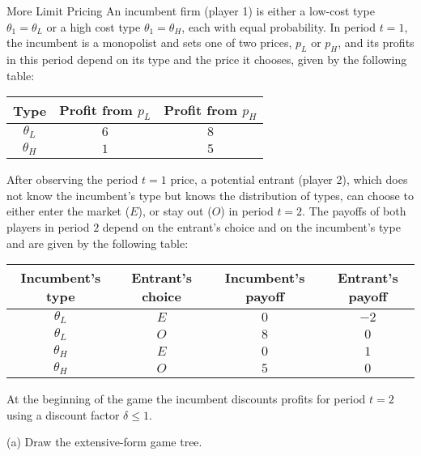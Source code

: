 \documentclass[8pt]{extarticle}
\title{}
\author{}
\date{}
\begin{document}
  \begin{problem}{More Limit Pricing}
    An incumbent firm (player 1) is either a low-cost type $\theta_1 = \theta_L$ or a high cost type $\theta_1 = \theta_H$, each with equal probability. In period $t=1$, the incumbent is a monopolist and sets one of two prices, $p_L$ or $p_H$, and its profits in this period depend on its type and the price it chooses, given by the following table:
    \begin{center}
      \begin{tabular}{ccc}
        Type & Profit from $p_L$ & Profit from $p_H$\\
        \hline
        $\theta_L$ & $6$ & $8$\\
        $\theta_H$ & $1$ & $5$
      \end{tabular}
    \end{center}
    After observing the period $t=1$ price, a potential entrant (player 2), which does not know the incumbent's type but knows the distribution of types, can choose to either enter the market ($E$), or stay out ($O$) in period $t=2$. The payoffs of both players in period $2$ depend on the entrant's choice and on the incumbent's type and are given by the following table:
    \begin{center}
      \begin{tabular}{cccc}
        Incumbent's type & Entrant's choice & Incumbent's payoff & Entrant's payoff\\
        \hline
        $\theta_L$ & $E$ & $0$ & $-2$\\
        $\theta_L$ & $O$ & $8$ & $0$\\
        $\theta_H$ & $E$ & $0$ & $1$\\
        $\theta_H$ & $O$ & $5$ & $0$
      \end{tabular}
    \end{center}
    At the beginning of the game the incumbent discounts profits for period $t=2$ using a discount factor $\delta \leq 1$.
    \begin{problem}{(a)}
      Draw the extensive-form game tree.
      \tcblower
    \begin{center}
      \small
\end{center}
\end{problem}
\end{problem}
\end{document}
